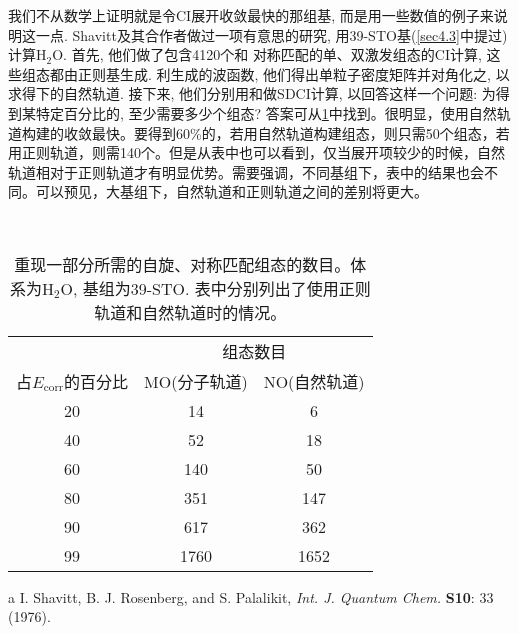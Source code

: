 我们不从数学上证明就是令CI展开收敛最快的那组基, 
而是用一些数值的例子来说明这一点. 
Shavitt及其合作者做过一项有意思的研究, 
用39-STO基(\ref{sec4.3}中提过)计算$\mathrm{H_2O}$. 
首先, 
他们做了包含4120个和\mci
{对称匹配}的单、双激发组态的CI计算, 这些组态都由正则\hft 基生成. 利生成的波函数, 他们得出单粒子密度矩阵并对角化之, 以求得下的自然轨道. 接下来, 他们分别用和做SDCI计算, 以回答这样一个问题: 为得到某特定百分比的, 至少需要多少个组态? 答案可从\ref{t4.12}中找到。很明显，使用自然轨道构建的收敛最快。要得到60\%的，若用自然轨道构建组态，则只需50个组态，若用正则轨道，则需140个。但是从表中也可以看到，仅当展开项较少的时候，自然轨道相对于正则轨道才有明显优势。需要强调，不同基组下，表中的结果也会不同。可以预见，大基组下，自然轨道和正则轨道之间的差别将更大。
\begin{table}[H]
	~\label{t4.12}
	\begin{threeparttable}
		\caption{重现一部分所需的自旋、对称匹配组态的数目。体系为$\mathrm{H_2O}$, 基组为39-STO. 表中分别列出了使用正则轨道和自然轨道时的情况。}
		\centering
		\begin{tabular}{ccc}
			\hline
			& \multicolumn{2}{c}{组态数目} \\ \cline{2-3}
			占$E_\mathrm{corr}$的百分比 & MO(分子轨道) &   NO(自然轨道) \\ \hline
			20               &    14        &       6       \\
			40               &    52        &      18       \\
			60               &   140        &      50       \\
			80               &   351        &      147      \\
			90               &   617        &      362      \\
			99               &   1760       &     1652      \\ \hline
		\end{tabular}
		\begin{tablenotes}
			\item[a] I. Shavitt, B. J. Rosenberg, and S. Palalikit, \textit{Int. J. Quantum Chem.} \textbf{S10}: 33 (1976).
		\end{tablenotes}
	\end{threeparttable}
\end{table}
